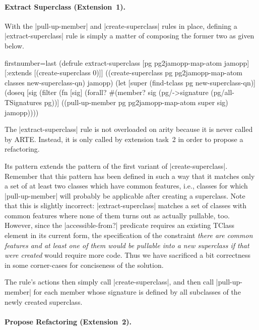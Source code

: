 \documentclass[submission]{eptcs}
\newcommand{\code}{\clojureinline}
\begin{document}
\paragraph{Extract Superclass (Extension~1).}

With the \code|pull-up-member| and \code|create-superclass| rules in place,
defining a \code|extract-superclass| rule is simply a matter of composing the
former two as given below.

\begin{clojurecode*}{firstnumber=last}
(defrule extract-superclass [pg pg2jamopp-map-atom jamopp]
  [:extends [(create-superclass 0)]]
  ((create-superclass pg pg2jamopp-map-atom classes new-superclass-qn) jamopp)
  (let [super (find-tclass pg new-superclass-qn)]
    (doseq [sig (filter (fn [sig]
                          (forall? #(member? sig (pg/->signature %
                        (pg/all-TSignatures pg))]
      ((pull-up-member pg pg2jamopp-map-atom super sig) jamopp))))
\end{clojurecode*}

The \code|extract-superclass| rule is not overloaded on arity because it is
never called by ARTE.  Instead, it is only called by extension task~2 in order
to propose a refactoring.

Its pattern extends the pattern of the first variant of
\code|create-superclass|.  Remember that this pattern has been defined in such
a way that it matches only a set of at least two classes which have common
features, i.e., classes for which \code|pull-up-member| will probably be
applicable after creating a superclass.  Note that this is slightly incorrect:
\code|extract-superclass| matches a set of classes with common features where
none of them turns out as actually pullable, too.  However, since the
\code|accessible-from?| predicate requires an existing \textsf{TClass} element
in its current form, the specification of the constraint \emph{there are common
  features and at least one of them would be pullable into a new superclass if
  that were created} would require more code.  Thus we have sacrificed a bit
correctness in some corner-cases for conciseness of the solution.

The rule's actions then simply call \code|create-superclass|, and then call
\code|pull-up-member| for each member whose signature is defined by all
subclasses of the newly created superclass.


\paragraph{Propose Refactoring (Extension~2).}
\end{document}
